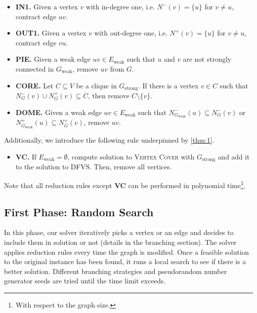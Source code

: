 \documentclass[a4paper,UKenglish,cleveref, autoref, thm-restate]{lipics-v2021}
\begin{document}
\begin{itemize}
    \item \textbf{IN1.} Given a vertex $v$ with in-degree one, i.e. $N^-(v)=\{u\}$ for $v \neq u$,
        contract edge $uv$.
    \item \textbf{OUT1.} Given a vertex $v$ with out-degree one, i.e. $N^+(v)=\{u\}$ for $v \neq u$,
        contract edge $vu$.
    \item \textbf{PIE.} Given a weak edge $uv \in E_\text{weak}$ such that $u$ and $v$ are not strongly connected in $G_\text{weak}$,
        remove $uv$ from $G$.
    \item \textbf{CORE.} Let $C \subseteq V$ be a clique in $G_\text{strong}$.
        If there is a vertex $v \in C$ such that $N_G^-(v) \cup N_G^+(v) \subseteq C$, then
        remove $C \setminus \{v\}$.
    \item \textbf{DOME.} Given a weak edge $uv \in E_\text{weak}$ such that
        $N_{G_\text{weak}}^-(u) \subseteq N_G^-(v)$ or
        $N_{G_\text{weak}}^+(u) \subseteq N_G^+(v)$, remove $uv$.
\end{itemize}

Additionally, we introduce the following rule underpinned by \cref{thm:1}.

\begin{itemize}
    \item \textbf{VC.} If $E_\text{weak} = \emptyset$, compute solution to \textsc{Vertex Cover} with $G_\text{strong}$
    and add it to the solution to \textsc{DFVS}. Then, remove all vertices.
\end{itemize}

Note that all reduction rules except \textbf{VC} can be performed in polynomial time\footnote{With respect to the graph size.}.

%
\subsection{First Phase: Random Search}

In this phase, our solver iteratively picks a vertex or an edge and decides to include them
 in solution or not (details in the branching section).
The solver applies reduction rules every time the graph is modified.
Once a feasible solution to the original instance has been found, it runs a local search to see
 if there is a better solution.
Different branching strategies and pseudorandom number generator seeds are tried until the time limit exceeds.
\end{document}
